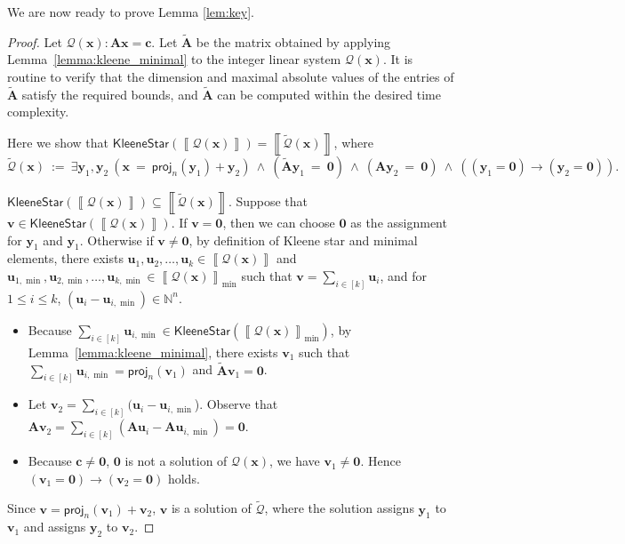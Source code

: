\documentclass[10pt,a4paper]{article}
\theoremstyle{definition}
\theoremstyle{remark}
\newcommand{\cQ}{\mathcal{Q}}
\newcommand{\cQtilde}{\tilde{\mathcal{Q}}}
\newcommand{\bbN}{\mathbb{N}}
\newcommand{\bfA}{\mathbf{A}}
\newcommand{\bfAtilde}{\tilde{\mathbf{A}}}
\newcommand{\bfc}{\mathbf{c}}
\newcommand{\bfu}{\mathbf{u}}
\newcommand{\bfv}{\mathbf{v}}
\newcommand{\bfx}{\mathbf{x}}
\newcommand{\bfy}{\mathbf{y}}
\newcommand{\bfzero}{\mathbf{0}}
\newcommand{\intsinterval}[1]{{\left[ #1 \right]}}
\newcommand{\projp}[2]     {\mathsf{proj}_{ #1 }\left( #2 \right)}
\newcommand{\kstar}[1] {\mathsf{KleeneStar}\left( #1 \right)}
\newcommand{\sol}[1] {\left\llbracket #1 \right\rrbracket}
\newcommand{\solmin}[1] {\left\llbracket #1 \right\rrbracket_\text{min}}
\begin{document}
We are now ready to prove Lemma \ref{lem:key}.
\begin{proof}
    Let $\cQ(\bfx): \bfA\bfx = \bfc$.
    Let $\bfAtilde$ be the matrix obtained by applying Lemma~\ref{lemma:kleene_minimal} to the integer linear system $\cQ(\bfx)$.
    It is routine to verify that the dimension and maximal absolute values of the entries of $\bfAtilde$ satisfy the required bounds, and $\bfAtilde$ can be computed within the desired time complexity.

    Here we show that $\kstar{\sol{\cQ(\bfx)}} = \sol{\cQtilde(\bfx)}$, where
    \begin{equation*}
        \cQtilde(\bfx)\ :=\ 
        \exists \bfy_1, \bfy_2\ 
        (\bfx\ =\ \projp{n}{\bfy_1} + \bfy_2)\ \land\ 
        (\bfAtilde\bfy_1\ =\ \bfzero)\ \land\ 
        (\bfA\bfy_2\ =\ \bfzero)\ \land\ 
        ((\bfy_1=\bfzero) \to (\bfy_2=\bfzero)).
    \end{equation*}

    \uline{$\kstar{\sol{\cQ(\bfx)}} \subseteq \sol{\cQtilde(\bfx)}$}.
    Suppose that $\bfv \in \kstar{\sol{\cQ(\bfx)}}$.
    If $\bfv = \bfzero$, then we can choose $\bfzero$
    as the assignment for $\bfy_1$ and $\bfy_1$.
    Otherwise if $\bfv \neq \bfzero$,
    by definition of Kleene star and minimal elements,
    there exists $\bfu_1, \bfu_2, \ldots, \bfu_k \in \sol{\cQ(\bfx)}$ and
    $\bfu_{1, \min}, \bfu_{2, \min}, \ldots, \bfu_{k, \min} \in \solmin{\cQ(\bfx)}$
    such that $\bfv = \sum_{i \in \intsinterval{k}} \bfu_i$,
    and for $1 \le i \le k$, $(\bfu_i - \bfu_{i, \min}) \in \bbN^n$.
    \begin{itemize}
        \item
            Because $\sum_{i \in \intsinterval{k}} \bfu_{i, \min} \in \kstar{\solmin{\cQ(\bfx)}}$,
            by Lemma~\ref{lemma:kleene_minimal},
            there exists
            $\bfv_1$ such that
            $\sum_{i \in \intsinterval{k}} \bfu_{i, \min} = \projp{n}{\bfv_1}$ and
            $\bfAtilde\bfv_1 = \bfzero$.
        \item
            Let $\bfv_2 = \sum_{i \in \intsinterval{k}} (\bfu_{i} - \bfu_{i, \min}$).
            Observe that
            $\bfA \bfv_2
            = \sum_{i \in \intsinterval{k}} \left(\bfA \bfu_{i} - \bfA \bfu_{i, \min}\right)
            = \bfzero$.
        \item
            Because $\bfc \neq \bfzero$, $\bfzero$ is not a solution of $\cQ(\bfx)$,
            we have $\bfv_1 \neq \bfzero$.
            Hence  $(\bfv_1=\bfzero) \to (\bfv_2=\bfzero)$ holds.
    \end{itemize}
    Since $\bfv = \projp{n}{\bfv_1} + \bfv_2$,
    $\bfv$ is a solution of $\cQtilde$, where the solution
    assigns $\bfy_1$ to $\bfv_1$ and assigns $\bfy_2$ to $\bfv_2$.


\end{proof}
\end{document}
